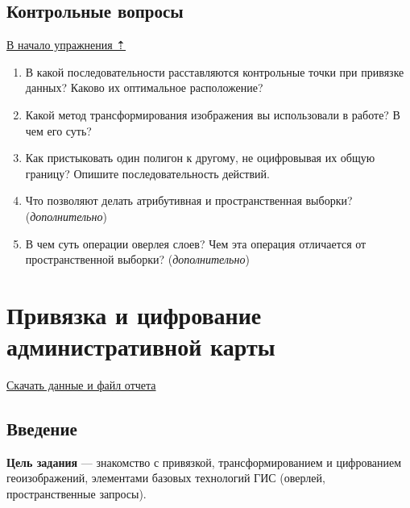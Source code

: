 \documentclass[]{book}
\theoremstyle{definition}
\theoremstyle{definition}
\theoremstyle{definition}
\theoremstyle{remark}
\begin{document}
\hypertarget{map-ref-hydrogeologic-questions}{%
\section{Контрольные вопросы}\label{map-ref-hydrogeologic-questions}}

\protect\hyperlink{map-ref-hydrogeologic}{В начало упражнения ⇡}

\begin{enumerate}
\def\labelenumi{\arabic{enumi}.}
\item
  В какой последовательности расставляются контрольные точки при
  привязке данных? Каково их оптимальное расположение?
\item
  Какой метод трансформирования изображения вы использовали в работе? В
  чем его суть?
\item
  Как пристыковать один полигон к другому, не оцифровывая их общую
  границу? Опишите последовательность действий.
\item
  Что позволяют делать атрибутивная и пространственная выборки?
  (\emph{дополнительно})
\item
  В чем суть операции оверлея слоев? Чем эта операция отличается от
  пространственной выборки? (\emph{дополнительно})
\end{enumerate}

\hypertarget{map-ref-economic}{%
\chapter{Привязка и цифрование административной
карты}\label{map-ref-economic}}

\href{http://autolab.geogr.msu.ru/gis/data/Ex07.zip}{Скачать данные и
файл отчета}

\hypertarget{map-ref-economic-intro}{%
\section{Введение}\label{map-ref-economic-intro}}

\textbf{Цель задания} --- знакомство с привязкой, трансформированием и
цифрованием геоизображений, элементами базовых технологий ГИС (оверлей,
пространственные запросы).
\end{document}
